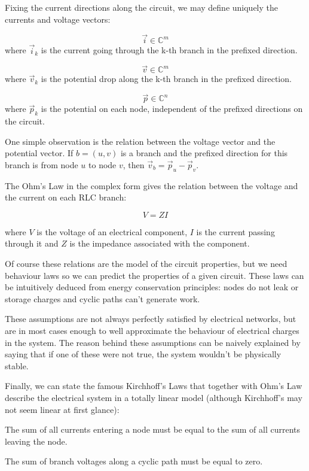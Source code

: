 \documentclass{comjnl}
\begin{document}
Fixing the current directions along the circuit, we may define uniquely the currents and voltage vectors:
\begin{definition}
$$ \vec{i} \in \mathbb{C}^m$$ where $\vec{i}_k$ is the current going through the k-th branch in the prefixed direction.
\end{definition}
\begin{definition}
$$ \vec{v} \in \mathbb{C}^m$$ where $\vec{v}_k$ is the potential drop along the k-th branch in the prefixed direction.
\end{definition}
\begin{definition}
$$ \vec{p} \in \mathbb{C}^n$$ where $\vec{p}_k$ is the potential on each node, independent of the prefixed directions on the circuit.
\end{definition}

One simple observation is the relation between the voltage vector and the potential vector. If $b=(u,v)$ is a branch and the prefixed direction for this branch is from node $u$ to node $v$, then $\vec{v}_b = \vec{p}_u - \vec{p}_v$. 

The Ohm's Law in the complex form gives the relation between the voltage and the current on each RLC branch:
\begin{axiom}[Ohm]
$$V = ZI $$
\end{axiom}
where $V$ is the voltage of an electrical component, $I$ is the current passing through it and $Z$ is the impedance associated with the component. 

Of course these relations are the model of the circuit properties, but we need behaviour laws so we can predict the properties of a given circuit. These laws can be intuitively deduced from energy conservation principles: nodes do not leak or storage charges and cyclic paths can't generate work.

These assumptions are not always perfectly satisfied by electrical networks, but are in most cases enough to well approximate the behaviour of electrical charges in the system. The reason behind these assumptions can be naively explained by saying that if one of these were not true, the system wouldn't be physically stable.

Finally, we can state the famous Kirchhoff's Laws that together with Ohm's Law describe the electrical system in a totally linear model (although Kirchhoff's may not seem linear at first glance):
\begin{axiom}
The sum of all currents entering a node must be equal to the sum of all currents leaving the node.
\end{axiom}
\begin{axiom}
The sum of branch voltages along a cyclic path must be equal to zero.
\end{axiom}
\end{document}
